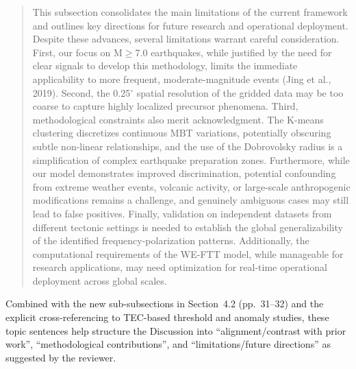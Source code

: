 \documentclass[12pt]{article}
\begin{document}
{\begin{quote}
This subsection consolidates the main limitations of the current framework and outlines key directions for future research and operational deployment. Despite these advances, several limitations warrant careful consideration. First, our focus on M$\ge$7.0 earthquakes, while justified by the need for clear signals to develop this methodology, limits the immediate applicability to more frequent, moderate-magnitude events (Jing et al., 2019). Second, the 0.25$^{\circ}$ spatial resolution of the gridded data may be too coarse to capture highly localized precursor phenomena. Third, methodological constraints also merit acknowledgment. The K-means clustering discretizes continuous MBT variations, potentially obscuring subtle non-linear relationships, and the use of the Dobrovolsky radius is a simplification of complex earthquake preparation zones. Furthermore, while our model demonstrates improved discrimination, potential confounding from extreme weather events, volcanic activity, or large-scale anthropogenic modifications remains a challenge, and genuinely ambiguous cases may still lead to false positives. Finally, validation on independent datasets from different tectonic settings is needed to establish the global generalizability of the identified frequency-polarization patterns. Additionally, the computational requirements of the WE-FTT model, while manageable for research applications, may need optimization for real-time operational deployment across global scales.
\end{quote}

Combined with the new sub-subsections in Section~4.2 (pp.~31--32) and the explicit cross-referencing to TEC-based threshold and anomaly studies, these topic sentences help structure the Discussion into ``alignment/contrast with prior work'', ``methodological contributions'', and ``limitations/future directions'' as suggested by the reviewer.
}
\end{document}
